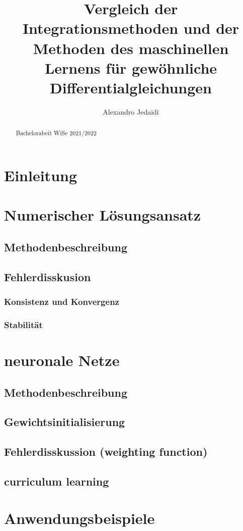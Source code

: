 \documentclass[
    paper=a4, %
    fontsize=12pt,  %
    oneside,        %
    headsepline,    %
    notitlepage     %
]{extarticle}         %
\author{Alexandro Jedaidi}
\title{\textbf{Vergleich der Integrationsmethoden und der Methoden des maschinellen Lernens für gewöhnliche Differentialgleichungen}}
\date{}
\begin{document}
    \maketitle
    \tableofcontents
    \newpage
    \begin{abstract}
        Bachelorabeit WiSe 2021/2022
    \end{abstract}
    \pagestyle{headings}

    \section{Einleitung}

    

    \section{Numerischer Lösungsansatz}
    \subsection{Methodenbeschreibung}
    \subsection{Fehlerdisskusion}
    \subsubsection{Konsistenz und Konvergenz}
    \subsubsection{Stabilität}

    \section{neuronale Netze}
    \subsection{Methodenbeschreibung}
    \subsection{Gewichtsinitialisierung}
    \subsection{Fehlerdisskussion (weighting function)}
    \subsection{curriculum learning}

    \section{Anwendungsbeispiele}

    \newpage
    \printbibliography[heading=bibintoc]
    \newpage
    \listoffigures
\end{document}
